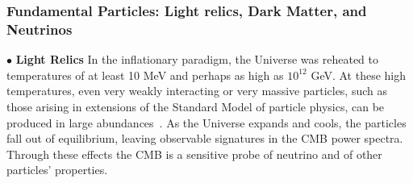 \documentclass[PICOReport.tex]{subfiles}
\begin{document}


\subsubsection{Fundamental Particles: Light relics, Dark Matter, and Neutrinos}
\label{sec:relics_neutrinos}

$\bullet$ {\bf Light Relics} \hspace{0.1in} In the inflationary paradigm, the Universe was reheated to temperatures of 
at least 10 MeV and perhaps as 
high as $10^{12}$ GeV.  At these high temperatures, even very weakly interacting or very massive particles, 
such as those arising in extensions of the Standard Model of particle physics, can be produced in large 
abundances~\cite{1979ARNPS..29..313S,Bolz:2000fu}.  As the Universe expands and cools, 
the particles fall out of equilibrium, leaving observable signatures in the CMB power spectra.
Through these effects the CMB is a sensitive probe of neutrino and of other particles' properties.  

\end{document}
